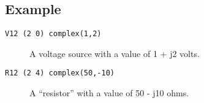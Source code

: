 \subsection{Example} 

\begin{description}

\item [{\tt V12 (2 0) complex(1,2)}]
A voltage source with a value of 1 + j2 volts.

\item [{\tt R12 (2 4) complex(50,-10)}]
A ``resistor'' with a value of 50 - j10 ohms.

\end{description}

